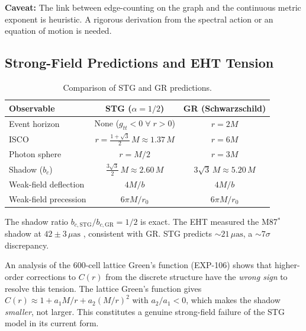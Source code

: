 \documentclass[12pt,a4paper]{article}
\begin{document}
\textbf{Caveat:} The link between edge-counting on the graph and the continuous metric exponent is heuristic. A rigorous derivation from the spectral action or an equation of motion is needed.

\subsection{Strong-Field Predictions and EHT Tension}

\begin{table}[H]
\centering
\begin{tabular}{lcc}
\toprule
\textbf{Observable} & \textbf{STG ($\alpha = 1/2$)} & \textbf{GR (Schwarzschild)} \\
\midrule
Event horizon & None ($g_{tt} < 0\;\forall\;r>0$) & $r = 2M$ \\
ISCO & $r = \tfrac{1+\sqrt{3}}{2}\,M \approx 1.37\,M$ & $r = 6M$ \\
Photon sphere & $r = M/2$ & $r = 3M$ \\
Shadow ($b_c$) & $\tfrac{3\sqrt{3}}{2}\,M \approx 2.60\,M$ & $3\sqrt{3}\,M \approx 5.20\,M$ \\
Weak-field deflection & $4M/b$ & $4M/b$ \\
Weak-field precession & $6\pi M/r_0$ & $6\pi M/r_0$ \\
\bottomrule
\end{tabular}
\caption{Comparison of STG and GR predictions.}
\label{tab:stg_vs_gr}
\end{table}

The shadow ratio $b_{c,\text{STG}}/b_{c,\text{GR}} = 1/2$ is exact. The EHT measured the M87$^*$ shadow at $42 \pm 3\,\mu\text{as}$ \cite{eht2019}, consistent with GR. STG predicts $\sim 21\,\mu\text{as}$, a $\sim 7\sigma$ discrepancy.

An analysis of the 600-cell lattice Green's function (EXP-106) shows that higher-order corrections to $C(r)$ from the discrete structure have the \emph{wrong sign} to resolve this tension. The lattice Green's function gives $C(r) \approx 1 + a_1 M/r + a_2 (M/r)^2$ with $a_2/a_1 < 0$, which makes the shadow \emph{smaller}, not larger. This constitutes a genuine strong-field failure of the STG model in its current form.
\end{document}
